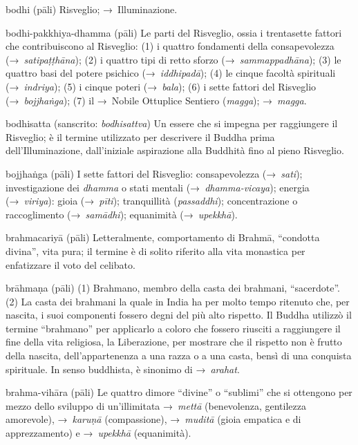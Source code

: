 \begin{glossarydescription}
\item[bodhi] (pāli) Risveglio; →~Illuminazione.

\item[bodhi-pakkhiya-dhamma] (pāli) Le parti del Risveglio, ossia i trentasette
  fattori che contribuiscono al Risveglio: (1) i quattro fondamenti della
  consapevolezza (→~\emph{satipaṭṭhāna}); (2) i quattro tipi di retto sforzo
  (→~\emph{sammappadhāna}); (3) le quattro basi del potere psichico
  (→~\emph{iddhipadā}); (4) le cinque facoltà spirituali (→~\emph{indriya}); (5)
  i cinque poteri (→~\emph{bala}); (6) i sette fattori del Risveglio
  (→~\emph{bojjhaṅga}); (7) il →~Nobile Ottuplice Sentiero (\emph{magga});
  →~\emph{magga}.

\item[bodhisatta] (sanscrito: \emph{bodhisattva}) Un essere che si impegna per
  raggiungere il Risveglio; è il termine utilizzato per descrivere il Buddha
  prima dell'Illuminazione, dall'iniziale aspirazione alla Buddhità fino al
  pieno Risveglio.

\item[bojjhaṅga] (pāli)\label{glossary-bojjhanga} I sette fattori del Risveglio: consapevolezza
  (→~\emph{sati}); investigazione dei \emph{dhamma} o stati mentali
  (→~\emph{dhamma-vicaya}); energia (→~\emph{viriya}): gioia (→~\emph{pīti});
  tranquillità (\emph{passaddhi}); concentrazione o raccoglimento
  (→~\emph{samādhi}); equanimità (→~\emph{upekkhā}).

\item[brahmacariyā] (pāli) Letteralmente, comportamento di Brahmā, ``condotta
  divina'', vita pura; il termine è di solito riferito alla vita monastica per
  enfatizzare il voto del celibato.

\item[brāhmaṇa] (pāli)\label{glossary-brahmana} (1) Brahmano, membro della casta dei brahmani,
  ``sacerdote''. (2) La casta dei brahmani la quale in India ha per molto tempo
  ritenuto che, per nascita, i suoi componenti fossero degni del più alto
  rispetto. Il Buddha utilizzò il termine ``brahmano'' per applicarlo a coloro
  che fossero riusciti a raggiungere il fine della vita religiosa, la
  Liberazione, per mostrare che il rispetto non è frutto della nascita,
  dell'appartenenza a una razza o a una casta, bensì di una conquista
  spirituale. In senso buddhista, è sinonimo di →~\emph{arahat}.

\item[brahma-vihāra] (pāli) Le quattro dimore ``divine'' o ``sublimi'' che si
  ottengono per mezzo dello sviluppo di un'illimitata →~\emph{mettā}
  (benevolenza, gentilezza amorevole), →~\emph{karuṇā} (compassione),
  →~\emph{muditā} (gioia empatica e di apprezzamento) e →~\emph{upekkhā}
  (equanimità).


\end{glossarydescription}
